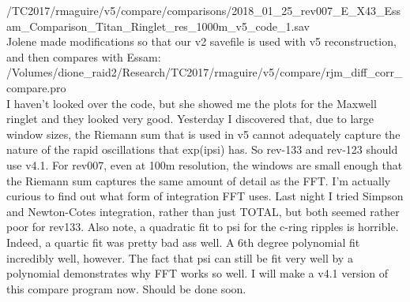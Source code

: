 \documentclass[crop=false,class=article,oneside]{standalone}
\begin{document}
/TC2017/rmaguire/v5/compare/comparisons/2018\_01\_25\_rev007\_E\_X43\_Essam\_Comparison\_Titan\_Ringlet\_res\_1000m\_v5\_code\_1.sav\\
Jolene made modifications so that our v2 savefile is used with v5 reconstruction, and then compares with Essam:\\
/Volumes/dione\_raid2/Research/TC2017/rmaguire/v5/compare/rjm\_diff\_corr\_compare.pro\\
I haven't looked over the code, but she showed me the plots for the Maxwell ringlet and they looked very good. Yesterday I discovered that, due to large window sizes, the Riemann sum that is used in v5 cannot adequately capture the nature of the rapid oscillations that exp(ipsi) has. So rev-133 and rev-123 should use v4.1. For rev007, even at 100m resolution, the windows are small enough that the Riemann sum captures the same amount of detail as the FFT. I'm actually curious to find out what form of integration FFT uses. Last night I tried Simpson and Newton-Cotes integration, rather than just TOTAL, but both seemed rather poor for rev133. Also note, a quadratic fit to psi for the c-ring ripples is horrible. Indeed, a quartic fit was pretty bad ass well. A 6th degree polynomial fit incredibly well, however. The fact that psi can still be fit very well by a polynomial demonstrates why FFT works so well. I will make a v4.1 version of this compare program now. Should be done soon.
\end{document}

